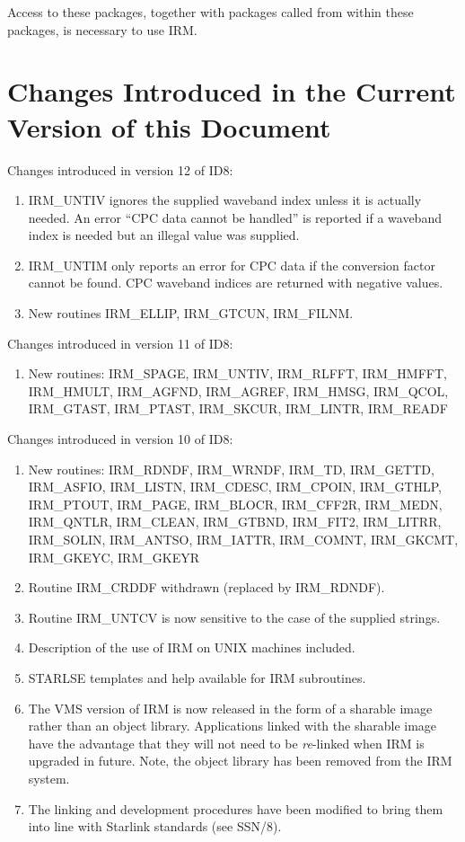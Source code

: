 Access to these packages, together with packages called from within these
packages, is necessary to use IRM.

\section {Changes Introduced in the Current Version of this Document}
\label {SEC:CHANGES}

Changes introduced in version 12 of ID8:
\begin{enumerate}
\item IRM\_UNTIV ignores the supplied waveband index unless it is actually
needed. An error ``CPC data cannot be handled'' is reported if a waveband index
is needed but an illegal value was supplied.
\item IRM\_UNTIM only reports an error for CPC data if the conversion factor
cannot be found. CPC waveband indices are returned with negative values.
\item New routines IRM\_ELLIP, IRM\_GTCUN, IRM\_FILNM.
\end{enumerate}

Changes introduced in version 11 of ID8:
\begin {enumerate}
\item New routines: IRM\_SPAGE, IRM\_UNTIV, IRM\_RLFFT, IRM\_HMFFT,
IRM\_HMULT, IRM\_AGFND, IRM\_AGREF, IRM\_HMSG, IRM\_QCOL, IRM\_GTAST,
IRM\_PTAST, IRM\_SKCUR, IRM\_LINTR, IRM\_READF
\end {enumerate}

Changes introduced in version 10 of ID8:
\begin {enumerate}
\item New routines: IRM\_RDNDF, IRM\_WRNDF, IRM\_TD, IRM\_GETTD, IRM\_ASFIO,
IRM\_LISTN, IRM\_CDESC, IRM\_CPOIN, IRM\_GTHLP, IRM\_PTOUT, IRM\_PAGE,
IRM\_BLOCR, IRM\_CFF2R, IRM\_MEDN, IRM\_QNTLR, IRM\_CLEAN, IRM\_GTBND,
IRM\_FIT2, IRM\_LITRR, IRM\_SOLIN, IRM\_ANTSO, IRM\_IATTR, IRM\_COMNT,
IRM\_GKCMT, IRM\_GKEYC, IRM\_GKEYR

\item Routine IRM\_CRDDF withdrawn (replaced by IRM\_RDNDF).
\item Routine IRM\_UNTCV is now sensitive to the case of the supplied strings.
\item Description of the use of IRM on UNIX machines included.
\item STARLSE templates and help available for IRM subroutines.
\item The VMS version of IRM is now released in the form of a sharable image
rather than an object library. Applications linked with the sharable image have
the advantage that they will not need to be {\em re}-linked when IRM is upgraded
in future. Note, the object library has been removed from the IRM system.
\item The linking and development procedures have been modified to bring them
into line with Starlink standards (see SSN/8).
\end {enumerate}


